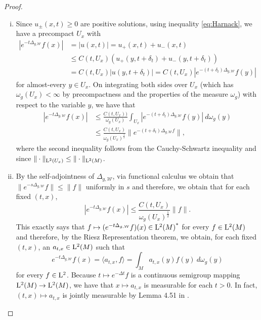 \documentclass[a4paper, 12pt]{amsart}
\numberwithin{equation}{section}
\renewcommand{\~}{\tilde}
\renewcommand{\-}{\bar}
\newcommand{\8}{\infty}
\newcommand{\cW}{\mathcal{W}}
\newcommand{\modulus}[1]{|#1|}
\newcommand{\norm}[1]{\| #1 \|}			%
\newcommand{\adj}[1]{{#1}^\ast}			%
\newcommand{\inprod}[1]{\langle #1 \rangle}	%
\newcommand{\Lp}[2][{}]{{\rm L}^{#2}_{\rm #1}}		%
\begin{document}
\begin{proof}
\begin{enumerate}[(i)]
\item  Since $u_{\pm}(x,t) \geq 0$ are positive solutions,
	using inequality \eqref{eq:Harnack}, we have a precompact $U_x$ 
	with 
	\begin{align*} 
	\modulus{e^{-t \Delta_{g,\cW}}f(x)}  &= \modulus{u(x,t)} = u_+(x,t) + u_-(x,t) \\
		&\leq C(t,U_x) (u_+(y,t+\delta_t) + u_-(y,t+\delta_t)) \\
		&= C(t,U_x) \modulus{u(y,t + \delta_t)}
		= C(t,U_x)  \modulus{e^{-(t + \delta_t) \Delta_{g,\cW}}f(y)}
	\end{align*} 
	for almost-every $y \in U_x$.
	On integrating both sides over $U_x$ (which has $\omega_g(U_x) < \infty$
	by precompactness and the properties of the measure $\omega_g$) with respect
	to the variable $y$,
	we have that
	\begin{align*} 
	\modulus{e^{-t \Delta_{g,\cW}}f(x)} 
		&\leq \frac{C(t,U_x))}{\omega_g(U_x)} \int_{U_x} \modulus{e^{-(t + \delta_t) \Delta_{g,\cW}}f(y)}\ d\omega_g(y) \\
		&\leq \frac{C(t,U_x)}{\omega_g(U_x)^{\frac{1}{2}}} \norm{e^{-(t + \delta_t) \Delta_{g,\cW}f}},
	\end{align*}
	where the second inequality follows from the Cauchy-Schwartz
	inequality and since $\norm{\cdot}_{\Lp{2}(U_x)} \leq \norm{\cdot}_{\Lp{2}(M)}$.

\item By the self-adjointness of $\Delta_{g,\cW}$, via functional calculus 
	we obtain that $\norm{e^{-s\Delta_{g,\cW}}f} \leq \norm{f}$
	uniformly in $s$  and therefore, we obtain that for each fixed \((t, x)\),
	$$\modulus{e^{-t \Delta_{g,\cW}}f(x)} \leq 
		\frac{C(t,U_x)}{\omega_g(U_x)^{\frac{1}{2}}} \norm{f}.$$
	This exactly says that $f \mapsto (e^{-t\Delta_{g,\cW}}f)(x) \in \adj{\Lp{2}(M)}$
	for every $f \in \Lp{2}(M)$ and therefore, by the Riesz Representation theorem,
	we obtain, for each fixed \((t, x)\), an $a_{t,x} \in \Lp{2}(M)$ such that
	$$ e^{-t \Delta_{g,\cW}}f(x) = \inprod{a_{t,x},f} = \int_{M} a_{t,x}(y)f(y)\ d\omega_g(y)$$
        for every \(f \in \Lp{2}\). Because \(t \mapsto e^{-\Delta t} f\) is a continuous semigroup mapping 
	\(\Lp{2}(M) \to \Lp{2}(M)\), we have that \(x \mapsto a_{t,x}\) is measurable for each $t > 0$.
	In fact, \((t, x) \mapsto a_{t,x}\) is jointly measurable by Lemma 4.51 in \cite{AB}.


\end{enumerate}
\end{proof}
\end{document}

